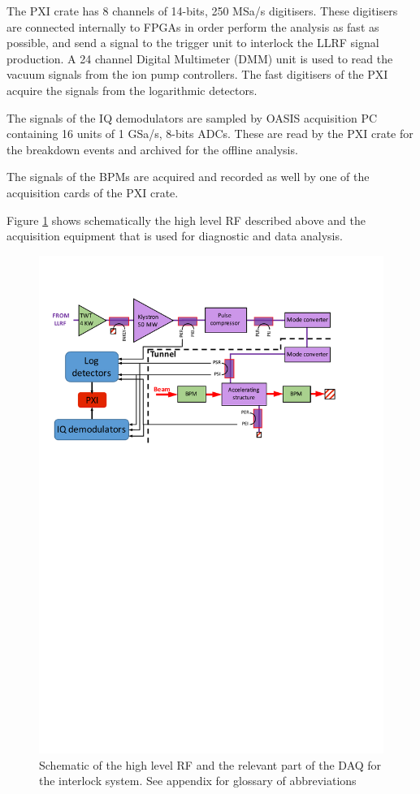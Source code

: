 The PXI crate has 8 channels of 14-bits, 250 MSa/s digitisers. These digitisers are connected internally to FPGAs in order perform the analysis as fast as possible, and send a signal to the trigger unit to interlock the LLRF signal production. A 24 channel Digital Multimeter (DMM) unit is used to read the vacuum signals from the ion pump controllers. The fast digitisers of the PXI acquire the signals from the logarithmic detectors. 

The signals of the IQ demodulators are sampled by OASIS acquisition PC containing 16 units of 1 GSa/s, 8-bits ADCs. These are read by the PXI crate for the breakdown events and archived for the offline analysis. 

The signals of the BPMs are acquired and recorded as well by one of the acquisition cards of the PXI crate.

Figure \ref{high_l_RF} shows schematically the high level RF described above and the acquisition equipment that is used for diagnostic and data analysis.

\begin{figure}[h]
\centering 
\includegraphics[scale=0.8]{pictures/high-level-RF-scheme.pdf}
\caption{Schematic of the high level RF and the relevant part of the DAQ for the interlock system. See appendix for glossary of abbreviations}
\label{high_l_RF}
\end{figure}



